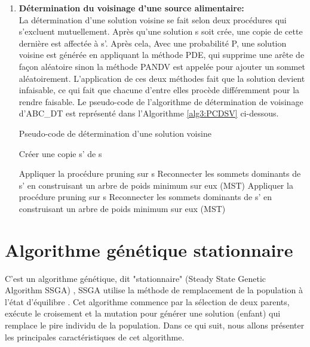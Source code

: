 \begin{enumerate}[label=\alph*)]
\begin{algorithm}[H]
{{		
	}
		
}

\end{algorithm}


	\item \textbf{Détermination du voisinage d’une source alimentaire:}\\
	La détermination d’une solution voisine se fait selon deux procédures qui s’excluent mutuellement. Après qu’une solution s soit crée, une copie de cette dernière est affectée à s’. Après cela, Avec une probabilité P, une solution voisine est générée en appliquant la méthode PDE, qui  supprime une arête de façon aléatoire sinon la méthode PANDV est appelée pour ajouter un sommet aléatoirement. L’application de ces deux méthodes fait que la solution devient infaisable, ce qui fait que chacune d’entre elles procède différemment pour la rendre faisable. Le pseudo-code de l’algorithme de détermination de voisinage d’ABC\_DT est représenté dans l’Algorithme \ref{alg3:PCDSV} ci-dessous.


\begin{algorithm}[H]
\label{alg3:PCDSV}
\caption{ Pseudo-code de détermination d'une solution voisine}
\SetAlgoLined
\DontPrintSemicolon

Créer une copie s' de s \;


Appliquer la procédure pruning sur s \;
Reconnecter les sommets dominants de s’ en construisant un arbre de poids minimum sur eux (MST) \;
Appliquer la procédure pruning sur s \;
Reconnecter les sommets dominants de s’ en construisant un arbre de poids minimum sur
eux (MST) \;

\end{algorithm}

\end{enumerate}


\section{Algorithme génétique stationnaire }
C’est un algorithme génétique, dit "stationnaire" (Steady State Genetic Algorithm SSGA) \cite{sundar2014steady}, SSGA utilise la méthode de remplacement de la population à l'état d'équilibre \cite{davis1991handbook}. Cet algorithme commence par la sélection de deux parents, exécute le croisement et la mutation pour générer une solution (enfant) qui remplace le pire individu de la population. Dans ce qui suit, nous allons présenter les principales caractéristiques de cet algorithme.

